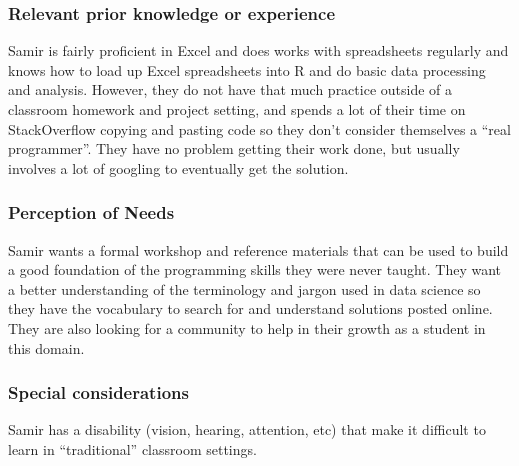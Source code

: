 \documentclass[../main.tex]{subfiles}
\begin{document}
            \subsubsection{Relevant prior knowledge or experience}

                Samir is fairly proficient in Excel and
                does works with spreadsheets regularly and
                knows how to load up Excel spreadsheets into R and do basic data processing and analysis.
                However,
                they do not have that much practice outside of a classroom homework and project setting,
                and spends a lot of their time on StackOverflow copying and pasting code
                so they don’t consider themselves a ``real programmer''.
                They have no problem getting their work done, but usually involves a lot of googling to eventually get the solution.

            \subsubsection{Perception of Needs}

                Samir wants a formal workshop and reference materials
                that can be used to build a good foundation of the programming skills they were never taught.
                They want a better understanding of the terminology and jargon used in data science
                so they have the vocabulary to search for and understand solutions posted online.
                They are also looking for a community to help in their growth as a student in this domain.

            \subsubsection{Special considerations}

                Samir has a disability (vision, hearing, attention, etc) that make it difficult to learn in ``traditional'' classroom settings.
\end{document}
